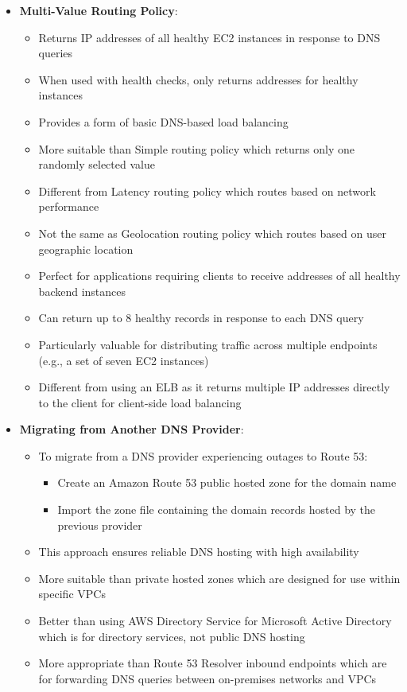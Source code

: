\documentclass[11pt,a4paper]{report}
\begin{document}
\begin{itemize}
  \item \textbf{Multi-Value Routing Policy}:
\begin{itemize}
  \item Returns IP addresses of all healthy EC2 instances in response to DNS queries
  \item When used with health checks, only returns addresses for healthy instances
  \item Provides a form of basic DNS-based load balancing
  \item More suitable than Simple routing policy which returns only one randomly selected value
  \item Different from Latency routing policy which routes based on network performance
  \item Not the same as Geolocation routing policy which routes based on user geographic location
  \item Perfect for applications requiring clients to receive addresses of all healthy backend instances
  \item Can return up to 8 healthy records in response to each DNS query
  \item Particularly valuable for distributing traffic across multiple endpoints (e.g., a set of seven EC2 instances)
  \item Different from using an ELB as it returns multiple IP addresses directly to the client for client-side load balancing
\end{itemize}
  \item \textbf{Migrating from Another DNS Provider}:
\begin{itemize}
  \item To migrate from a DNS provider experiencing outages to Route 53:
\begin{itemize}
  \item Create an Amazon Route 53 public hosted zone for the domain name
  \item Import the zone file containing the domain records hosted by the previous provider
\end{itemize}
  \item This approach ensures reliable DNS hosting with high availability
  \item More suitable than private hosted zones which are designed for use within specific VPCs
  \item Better than using AWS Directory Service for Microsoft Active Directory which is for directory services, not public DNS hosting
  \item More appropriate than Route 53 Resolver inbound endpoints which are for forwarding DNS queries between on-premises networks and VPCs
\end{itemize}
\end{itemize}
\end{document}
